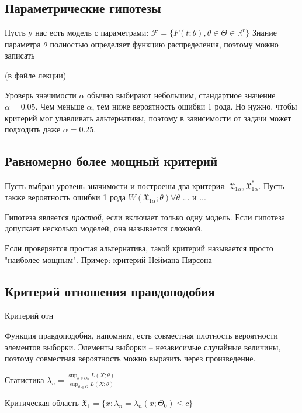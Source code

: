\documentclass[main.tex]{subfiles}
\begin{document}
\subsection{Параметрические гипотезы}
Пусть у нас есть модель с параметрами: $ \mathcal{F} = \{F(t;\theta), \theta \in \Theta \in \mathds{R}^r\} $
Знание параметра $\theta$ полностью определяет функцию распределения, поэтому можно записать 

(в файле лекции)

Уроверь значимости $ \alpha $ обычно выбирают небольшим, стандартное значение $ \alpha = 0.05 $. Чем меньше $ \alpha $, тем ниже вероятность ошибки 1 рода. Но нужно, чтобы критерий мог улавливать альтернативы, поэтому в зависимости от задачи может подходить даже $ \alpha = 0.25 $.

\subsection{Равномерно более мощный критерий}

Пусть выбран уровень значимости и построены два критерия: $ \mathfrak{X}_{1 \alpha}, \mathfrak{X}_{1 \alpha}^* $.
Пусть также вероятность ошибки 1 рода $ W(\mathfrak{X}_{1 \alpha}; \theta) \forall \theta $ ... и ... %


Гипотеза является \emph{простой}, если включает только одну модель. Если гипотеза допускает несколько моделей, она называется сложной.

Если проверяется простая альтернатива, такой критерий называется просто "наиболее мощным". Пример: критерий Неймана-Пирсона %

\subsection{Критерий отношения правдоподобия}

Критерий отн

Функция правдоподобия, напомним, есть совместная плотность вероятности элементов выборки. Элементы выборки -- независимые случайные величины, поэтому совместная вероятность можно выразить через произведение.

Статистика $ \lambda_n = \frac{\sup_{\theta \in \Theta_0} L(X;\theta)}{\sup_{\theta \in \Theta} L(X;\theta)} $

Критическая область $ \mathfrak{X}_1 = \{x: \lambda_n = \lambda_n(x; \Theta_0) \le c\} $
\end{document}
